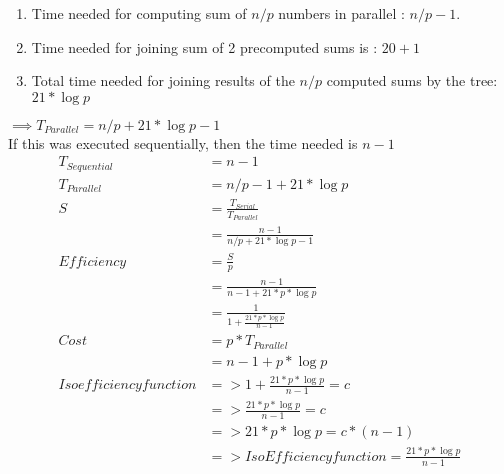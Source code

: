 \documentclass[11pt]{article}
\begin{document}
\begin{enumerate}
\begin{itemize}
\begin{enumerate}
					\item Time needed for computing sum of $n/p$ numbers in parallel : $n/p-1$.
					\item Time needed for joining sum of 2 precomputed sums is : $20+1$
					\item Total time needed for joining results of the $n/p$ computed sums by the tree: $21*\log p$
				\end{enumerate}
				$\implies T_{Parallel} = n/p + 21*\log p -1$
				\\ If this was executed sequentially, then the time needed is $n-1$ \\
				\begin{align*}
					T_{Sequential} &= n-1 \\
					T_{Parallel} &= n/p -1 + 21*\log p \\
						S &= \frac{T_{Serial}}{T_{Parallel}} \\
						&= \frac{n-1}{n/p +21*\log p -1} \\
					Efficiency &= \frac{S}{p} \\
					&= \frac{n-1}{n-1 +21*p*\log p} \\
					&= \frac{1}{1+\frac{21*p*\log p}{n-1}}\\
					Cost &= p*T_{Parallel}\\
							&=n-1+p*\log p\\
					Iso efficiency function &=> 1+ \frac{21*p*\log p}{n-1} = c\\
						&=> \frac{21*p*\log p}{n-1}= c\\
						&=> 21*p*\log p= c*(n-1)\\
						&=> Iso Efficiency function = \frac{21*p*\log p}{n-1}
				\end{align*}


	\end{itemize}







\end{enumerate}
\end{document}
